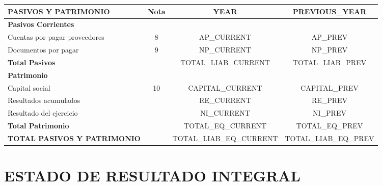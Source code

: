 \documentclass[10pt,letterpaper]{article}
\begin{document}
\begin{tabularx}{\textwidth}{X c S S}

\toprule
\textbf{PASIVOS Y PATRIMONIO} & Nota & {{{YEAR}}} & {{{PREVIOUS_YEAR}}} \\
\midrule

\textbf{Pasivos Corrientes} & & & \\

Cuentas por pagar proveedores & 8 & {{AP_CURRENT}} & {{AP_PREV}} \\
Documentos por pagar & 9 & {{NP_CURRENT}} & {{NP_PREV}} \\

\textbf{Total Pasivos} & & {{TOTAL_LIAB_CURRENT}} & {{TOTAL_LIAB_PREV}} \\

\addlinespace

\textbf{Patrimonio} & & & \\

Capital social & 10 & {{CAPITAL_CURRENT}} & {{CAPITAL_PREV}} \\
Resultados acumulados & & {{RE_CURRENT}} & {{RE_PREV}} \\
Resultado del ejercicio & & {{NI_CURRENT}} & {{NI_PREV}} \\

\textbf{Total Patrimonio} & & {{TOTAL_EQ_CURRENT}} & {{TOTAL_EQ_PREV}} \\

\midrule

\textbf{TOTAL PASIVOS Y PATRIMONIO} & & {{TOTAL_LIAB_EQ_CURRENT}} & {{TOTAL_LIAB_EQ_PREV}} \\

\bottomrule
\end{tabularx}

\newpage


\section{ESTADO DE RESULTADO INTEGRAL}
\end{document}
